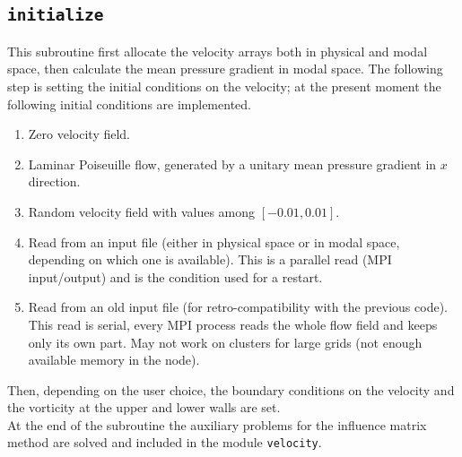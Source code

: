 \subsection{\texttt{initialize}}
This subroutine first allocate the velocity arrays both in physical and modal space, then calculate the mean pressure gradient in modal space. 
The following step is setting the initial conditions on the velocity; at the present moment the following initial conditions are implemented.
\begin{enumerate}
\item Zero velocity field.
\item Laminar Poiseuille flow, generated by a unitary mean pressure gradient in $x$ direction.
\item Random velocity field with values among $[-0.01,0.01]$.
\item Read from an input file (either in physical space or in modal space, depending on which one is available). This is a parallel read (MPI input/output) and is the condition used for a restart.
\item Read from an old input file (for retro-compatibility with the previous code).  This read is serial, every MPI process reads the whole flow field and keeps only its own part. May not work on clusters for large grids (not enough available memory in the node).
\end{enumerate}
Then, depending on the user choice, the boundary conditions on the velocity and the vorticity at the upper and lower walls are set.\\
At the end of the subroutine the auxiliary problems for the influence matrix method are solved and included in the module \texttt{velocity}. 

